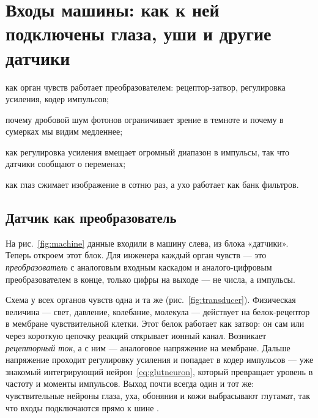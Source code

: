 \chapter{Входы машины: как к ней подключены глаза, уши и другие датчики}
\label{sec:sensors}
\begin{chaptergoals}
\item как орган чувств работает преобразователем: рецептор-затвор, регулировка усиления, кодер импульсов;
\item почему дробовой шум фотонов ограничивает зрение в темноте и почему в сумерках мы видим медленнее;
\item как регулировка усиления вмещает огромный диапазон в импульсы, так что датчики сообщают о переменах;
\item как глаз сжимает изображение в сотню раз, а ухо работает как банк фильтров.
\end{chaptergoals}

\section{Датчик как преобразователь}

На рис.~\ref{fig:machine} данные входили в машину слева, из блока «датчики». Теперь откроем этот блок. Для инженера каждый орган чувств --- это \emph{преобразователь} с аналоговым входным каскадом и аналого-цифровым преобразователем в конце, только цифры на выходе --- не числа, а импульсы.

Схема у всех органов чувств одна и та же (рис.~\ref{fig:transducer}). Физическая величина --- свет, давление, колебание, молекула --- действует на белок-рецептор в мембране чувствительной клетки. Этот белок работает как затвор: он сам или через короткую цепочку реакций открывает ионный канал. Возникает \emph{рецепторный ток}, а с ним --- аналоговое напряжение на мембране. Дальше напряжение проходит регулировку усиления и попадает в кодер импульсов --- уже знакомый интегрирующий нейрон~\eqref{eq:glutneuron}, который превращает уровень в частоту и моменты импульсов. Выход почти всегда один и тот же: чувствительные нейроны глаза, уха, обоняния и кожи выбрасывают глутамат, так что входы подключаются прямо к шине .

